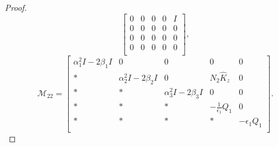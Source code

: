 \begin{proof}
\begin{equation}
\begin{bmatrix}
		0&0&0&0&I\\
		0&0& 0&0&0\\
		0&0&0& 0&0\\
		0&0&0&0&0\\
	\end{bmatrix},
\end{equation}
%
\begin{equation}
	\mathcal{M}_{22}=
	\begin{bmatrix}
		\alpha_1^2{I}-2\beta_1 {I}&0&0&0&0 \\
		*&\alpha_2^2{I}-2\beta_2 {I}& 0&{N}_2\hat{{K}}_z&0\\
		* & *&\alpha_3^2{I}-2\beta_3 {I}&0&0\\
		* & *&*&-\frac{1}{\epsilon_1}{Q}_1&0\\
		*&*&*&*&-\epsilon_1{Q}_1\\
	\end{bmatrix}.
\end{equation}%


\end{proof}
